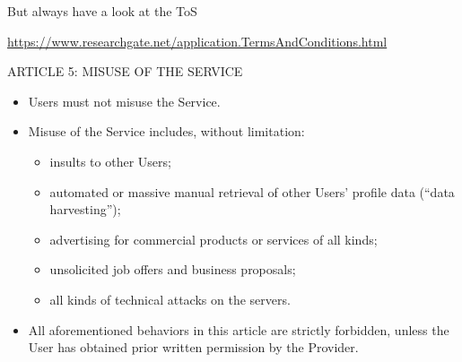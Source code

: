 \documentclass[ignorenonframetext,]{beamer}
\providecommand{\tightlist}{%
  \setlength{\itemsep}{0pt}\setlength{\parskip}{0pt}}
\begin{document}
\begin{frame}{But always have a look at the ToS}

\url{https://www.researchgate.net/application.TermsAndConditions.html}

ARTICLE 5: MISUSE OF THE SERVICE

\begin{itemize}
\tightlist
\item
  Users must not misuse the Service.
\item
  Misuse of the Service includes, without limitation:

  \begin{itemize}
  \tightlist
  \item
    insults to other Users;
  \item
    automated or massive manual retrieval of other Users' profile data
    (``data harvesting'');
  \item
    advertising for commercial products or services of all kinds;
  \item
    unsolicited job offers and business proposals;
  \item
    all kinds of technical attacks on the servers.
  \end{itemize}
\item
  All aforementioned behaviors in this article are strictly forbidden,
  unless the User has obtained prior written permission by the Provider.
\end{itemize}

\end{frame}
\end{document}
